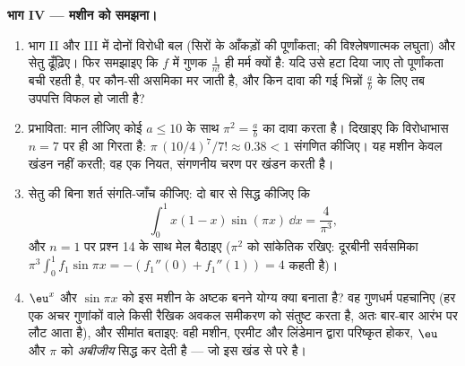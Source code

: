 \begin{problem}
\medskip \noindent\textbf{भाग IV --- मशीन को समझना।}
\begin{enumerate}[resume]
  \item भाग II और III में दोनों विरोधी बल (सिरों के आँकड़ों की पूर्णांकता;
   की विश्लेषणात्मक लघुता) और सेतु ढूँढ़िए। फिर समझाइए कि $f$ में गुणक
  $\frac{1}{n!}$ ही मर्म क्यों है: यदि उसे हटा दिया जाए तो पूर्णांकता बची
  रहती है, पर कौन-सी असमिका मर जाती है, और किन दावा की गई भिन्नों $\frac ab$
  के लिए तब उपपत्ति विफल हो जाती है?
  \item प्रभाविता: मान लीजिए कोई $a \leq 10$ के साथ $\pi^2 = \frac ab$ का
  दावा करता है। दिखाइए कि विरोधाभास $n = 7$ पर ही आ गिरता है:
  $\pi\,(10/4)^7/7! \approx 0.38 < 1$ संगणित कीजिए। यह मशीन केवल खंडन नहीं
  करती; वह एक नियत, संगणनीय चरण पर खंडन करती है।
  \item सेतु की बिना शर्त संगति-जाँच कीजिए: दो बार  से सिद्ध
  कीजिए कि
        \[
        \int_0^1 x(1 - x)\sin(\pi x)\,\dd x = \frac{4}{\pi^3},
        \]
        और $n = 1$ पर प्रश्न 14 के साथ मेल बैठाइए ($\pi^2$ को सांकेतिक रखिए:
        दूरबीनी सर्वसमिका $\pi^3 \int_0^1 f_1 \sin \pi x = -(f_1''(0) +
        f_1''(1)) = 4$ कहती है)।
  \item $\eu^x$ और $\sin \pi x$ को इस मशीन के अष्टक बनने योग्य क्या बनाता
  है? वह गुणधर्म पहचानिए (हर एक अचर गुणांकों वाले किसी रैखिक अवकल समीकरण को
  संतुष्ट करता है, अतः बार-बार  आरंभ पर लौट आता है), और सीमांत
  बताइए: वही मशीन, एरमीट और लिंडेमान द्वारा परिष्कृत होकर, $\eu$ और $\pi$ को
  \emph{अबीजीय} सिद्ध कर देती है --- जो इस खंड से परे है।
\end{enumerate}


\end{problem}
